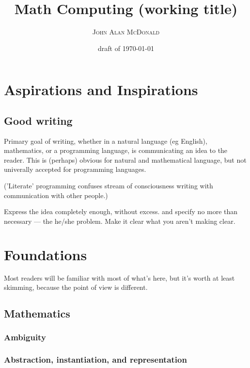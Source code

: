 \documentclass[10pt,openany]{book}
\title{Math Computing (working title)}
\author{\textsc{John Alan McDonald}}
\date{draft of \today}
\begin{document}
\maketitle

\frontmatter

\begingroup
\let\onecolumn\twocolumn
\sffamily
\tableofcontents
\rmfamily
\endgroup

\mainmatter

\part{Aspirations and Inspirations}
\chapter{Good writing}

Primary goal of writing, whether in a natural language (eg
English), mathematics, or a programming language, is communicating
an idea to the reader.
This is (perhaps) obvious for natural and mathematical language,
but not univerally accepted for programming languages.

\cite{Halmos1970HowToWrite}

('Literate' programming confuses stream of consciousness writing
with communication with other people.)

Express the idea completely enough, without excess.
and specify no more than
necessary --- the he/she problem.
Make it clear what you aren't making clear.

\part{Foundations}

Most readers will be familiar with most of what's here, 
but it's worth at least skimming, 
because the point of view is different.

\chapter{Mathematics}
\section{Ambiguity}
\section{Abstraction, instantiation, and representation}
\end{document}
